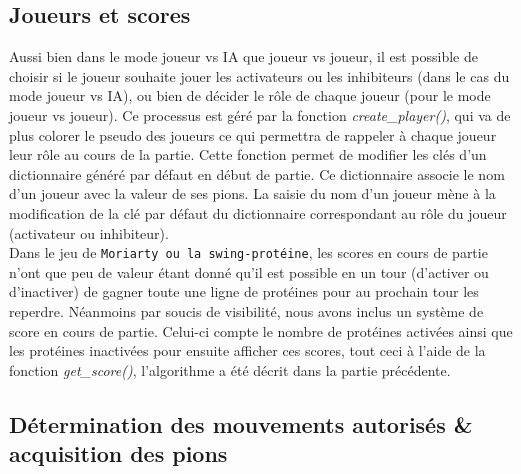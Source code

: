 \subsection{Joueurs et scores}

Aussi bien dans le mode joueur vs IA que joueur vs joueur, il est possible de choisir si le joueur souhaite jouer les activateurs ou les inhibiteurs (dans le cas du mode joueur vs IA), ou bien de décider le rôle de chaque joueur (pour le mode joueur vs joueur).
Ce processus est géré par la fonction \textit{create\_player()}, qui va de plus colorer le pseudo des joueurs ce qui permettra de rappeler à chaque joueur leur rôle au cours de la partie. Cette fonction permet de modifier les clés d'un dictionnaire généré par défaut en début de partie. Ce dictionnaire associe le nom d'un joueur avec la valeur de ses pions. La saisie du nom d'un joueur mène à la modification de la clé par défaut du dictionnaire correspondant au rôle du joueur (activateur ou inhibiteur).
\\Dans le jeu de \verb|Moriarty ou la swing-protéine|, les scores en cours de partie n'ont que peu de valeur étant donné qu'il est possible en un tour (d'activer ou d'inactiver) de gagner toute une ligne de protéines pour au prochain tour les reperdre. Néanmoins par soucis de visibilité, nous avons inclus un système de score en cours de partie. Celui-ci compte le nombre de protéines activées ainsi que les protéines inactivées pour ensuite afficher ces scores, tout ceci à l'aide de la fonction \textit{get\_score()}, l'algorithme a été décrit dans la partie précédente.

\subsection{Détermination des mouvements autorisés \& acquisition des pions}

